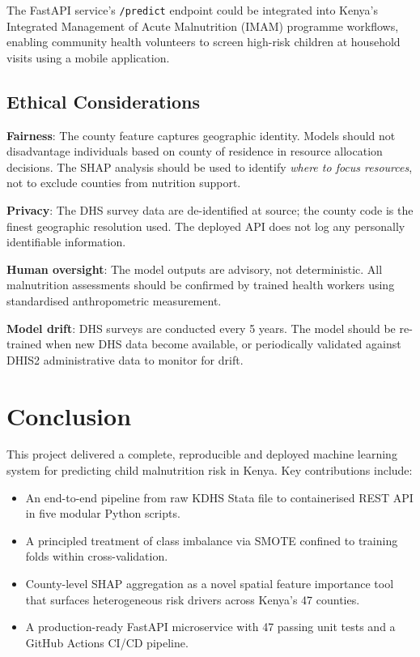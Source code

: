 \documentclass[12pt, a4paper]{article}
\begin{document}
The FastAPI service's \texttt{/predict} endpoint could be integrated
into Kenya's Integrated Management of Acute Malnutrition (IMAM)
programme workflows, enabling community health volunteers to screen
high-risk children at household visits using a mobile application.

\subsection{Ethical Considerations}

\textbf{Fairness}: The county feature captures geographic identity.
Models should not disadvantage individuals based on county of residence
in resource allocation decisions. The SHAP analysis should be used to
identify \emph{where to focus resources}, not to exclude counties from
nutrition support.

\textbf{Privacy}: The DHS survey data are de-identified at source; the
county code is the finest geographic resolution used. The deployed API
does not log any personally identifiable information.

\textbf{Human oversight}: The model outputs are advisory, not
deterministic. All malnutrition assessments should be confirmed by
trained health workers using standardised anthropometric measurement.

\textbf{Model drift}: DHS surveys are conducted every 5 years. The model
should be re-trained when new DHS data become available, or periodically
validated against DHIS2 administrative data to monitor for drift.

\section{Conclusion}

This project delivered a complete, reproducible and deployed machine
learning system for predicting child malnutrition risk in Kenya.
Key contributions include:

\begin{itemize}[noitemsep]
    \item An end-to-end pipeline from raw KDHS Stata file to containerised
          REST API in five modular Python scripts.
    \item A principled treatment of class imbalance via SMOTE confined to
          training folds within cross-validation.
    \item County-level SHAP aggregation as a novel spatial feature
          importance tool that surfaces heterogeneous risk drivers across
          Kenya's 47 counties.
    \item A production-ready FastAPI microservice with 47 passing unit
          tests and a GitHub Actions CI/CD pipeline.
\end{itemize}
\end{document}
